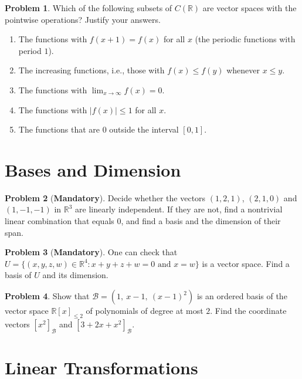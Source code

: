 \documentclass[11pt]{article}
\theoremstyle{definition}
\newtheorem{problem}{Problem}[section]
\newcommand{\mandatory}{\textcolor{red!70!black}{\textbf{Mandatory}}}
\begin{document}
\begin{problem}\label{pr:fn-sets}
    Which of the following subsets of $C(\mathbb{R})$ are vector spaces with the pointwise operations? Justify your answers.
    \begin{enumerate}[label=(\alph*)]
        \item The functions with $f(x + 1) = f(x)$ for all $x$ (the periodic functions with period $1$).
        \item The increasing functions, i.e., those with $f(x) \leq f(y)$ whenever $x \leq y$.
        \item The functions with $\lim_{x \to \infty} f(x) = 0$.
        \item The functions with $|f(x)| \leq 1$ for all $x$.
        \item The functions that are $0$ outside the interval $[0, 1]$.
    \end{enumerate}
\end{problem}

\section{Bases and Dimension}

\begin{problem}[\mandatory]\label{pr:indep}
    Decide whether the vectors $(1, 2, 1)$, $(2, 1, 0)$ and $(1, -1, -1)$ in $\mathbb{R}^3$ are linearly independent. If they are not, find a nontrivial linear combination that equals $0$, and find a basis and the dimension of their span.
\end{problem}

\begin{problem}[\mandatory]\label{pr:basisU}
    One can check that $U = \{(x, y, z, w) \in \mathbb{R}^4 : x + y + z + w = 0 \text{ and } x = w\}$ is a vector space. Find a basis of $U$ and its dimension.
\end{problem}

\begin{problem}\label{pr:taylor-basis}
    Show that $\mathcal{B} = (1, \ x - 1, \ (x - 1)^2)$ is an ordered basis of the vector space $\mathbb{R}[x]_{\leq 2}$ of polynomials of degree at most $2$. Find the coordinate vectors $[x^2]_{\mathcal{B}}$ and $[3 + 2x + x^2]_{\mathcal{B}}$.
\end{problem}

\section{Linear Transformations}
\end{document}
